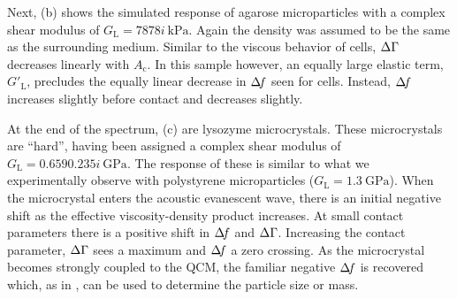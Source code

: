 Next, (b) shows the simulated response of agarose
microparticles with a complex shear modulus of
$G_\mathrm{L}=\SI{78+78i}{\kilo\pascal}$. Again the density was assumed to
be the same as the surrounding medium.  Similar to the viscous behavior of
cells, $\Delta\Gamma$ decreases linearly with $A_\mathrm{c}$.  In this
sample however, an equally large elastic term, $G'_\mathrm{L}$, precludes
the equally linear decrease in $\Delta\!f$ seen for cells.  Instead, $\Delta\!f$ increases
slightly before contact and decreases slightly.

At the end of the spectrum, (c) are lysozyme
microcrystals.  These microcrystals are ``hard'', having been assigned a
complex shear modulus of $G_\mathrm{L}=\SI{0.659+0.235i}{\giga\pascal}$.
The response of these is similar to what we experimentally observe with
polystyrene microparticles ($G_\mathrm{L}=\SI{1.3}{\giga\pascal}$).  When
the microcrystal enters the acoustic evanescent wave, there is an initial
negative shift as the effective viscosity-density product increases.  At
small contact parameters there is a positive shift in $\Delta\!f$ and $\Delta\Gamma$.
Increasing the contact parameter, $\Delta\Gamma$ sees a maximum and $\Delta\!f$ a zero
crossing.  As the microcrystal becomes strongly coupled to the QCM, the
familiar negative $\Delta\!f$ is recovered which, as in ,
can be used to determine the particle size or mass.
